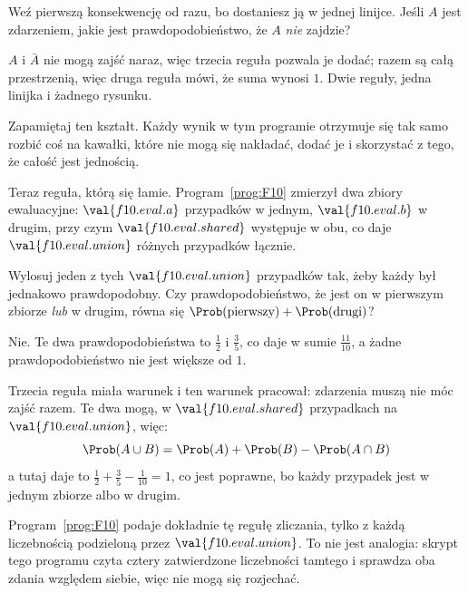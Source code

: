 \begin{fr}
Weź pierwszą konsekwencję od razu, bo dostaniesz ją w jednej linijce. Jeśli
$A$ jest zdarzeniem, jakie jest prawdopodobieństwo, że $A$ \emph{nie} zajdzie?
\dotline
\nextframe
\end{fr}

\begin{fr}

$A$ i $\bar{A}$ nie mogą zajść naraz, więc trzecia reguła pozwala je dodać;
razem są całą przestrzenią, więc druga reguła mówi, że suma wynosi $1$. Dwie
reguły, jedna linijka i żadnego rysunku.

Zapamiętaj ten kształt. Każdy wynik w tym programie otrzymuje się tak samo
\dash{} rozbić coś na kawałki, które nie mogą się nakładać, dodać je i
skorzystać z tego, że całość jest jednością.
\end{fr}

\begin{fr}
Teraz reguła, którą się łamie. Program~\ref{prog:F10} zmierzył dwa zbiory
ewaluacyjne: $\val{f10.eval.a}$ przypadków w jednym, $\val{f10.eval.b}$ w
drugim, przy czym $\val{f10.eval.shared}$ występuje w obu, co daje
$\val{f10.eval.union}$ różnych przypadków łącznie.

Wylosuj jeden z tych $\val{f10.eval.union}$ przypadków tak, żeby każdy był
jednakowo prawdopodobny. Czy prawdopodobieństwo, że jest on w pierwszym zbiorze
\emph{lub} w drugim, równa się
$\Prob(\text{pierwszy}) + \Prob(\text{drugi})$?
\dotline
\nextframe
\end{fr}

\begin{fr}
\begin{ansblock}
Nie. Te dwa prawdopodobieństwa to $\frac{1}{2}$ i $\frac{3}{5}$, co daje w
sumie $\frac{11}{10}$, a żadne prawdopodobieństwo nie jest większe od $1$.
\end{ansblock}

Trzecia reguła miała warunek i ten warunek pracował: zdarzenia muszą nie móc
zajść razem. Te dwa mogą, w $\val{f10.eval.shared}$ przypadkach na
$\val{f10.eval.union}$, więc:
\[ \Prob(A \cup B) = \Prob(A) + \Prob(B) - \Prob(A \cap B) \]
a tutaj daje to $\frac{1}{2} + \frac{3}{5} - \frac{1}{10} = 1$, co jest
poprawne, bo każdy przypadek jest w jednym zbiorze albo w drugim.

Program~\ref{prog:F10} podaje dokładnie tę regułę zliczania, tylko z każdą
liczebnością podzieloną przez $\val{f10.eval.union}$. To nie jest analogia:
skrypt tego programu czyta cztery zatwierdzone liczebności tamtego i sprawdza
oba zdania względem siebie, więc nie mogą się rozjechać.
\end{fr}

